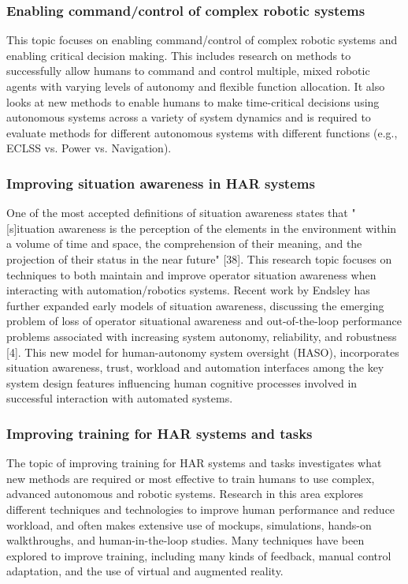 \subsubsection{Enabling command/control of complex robotic systems}
This topic focuses on enabling command/control of complex robotic systems and enabling critical decision making. This includes research on methods to successfully allow humans to command and control multiple, mixed robotic agents with varying levels of autonomy and flexible function allocation. It also looks at new methods to enable humans to make time-critical decisions using autonomous systems across a variety of system dynamics and is required to evaluate methods for different autonomous systems with different functions (e.g., ECLSS vs. Power vs. Navigation).

\subsubsection{Improving situation awareness in HAR systems}
One of the most accepted definitions of situation awareness states that "[s]ituation awareness is the perception of the elements in the environment within a volume of time and space, the comprehension of their meaning, and the projection of their status in the near future" [38]. This research topic focuses on techniques to both maintain and improve operator situation awareness when interacting with automation/robotics systems. Recent work by Endsley has further expanded early models of situation awareness, discussing the emerging problem of loss of operator situational awareness and out-of-the-loop performance problems associated with increasing system autonomy, reliability, and robustness [4]. This new model for human-autonomy system oversight (HASO), incorporates situation awareness, trust, workload and automation interfaces among the key system design features influencing human cognitive processes involved in successful interaction with automated systems.

\subsubsection{Improving training for HAR systems and tasks}
The topic of improving training for HAR systems and tasks investigates what new methods are required or most effective to train humans to use complex, advanced autonomous and robotic systems. Research in this area explores different techniques and technologies to improve human performance and reduce workload, and often makes extensive use of mockups, simulations, hands-on walkthroughs, and human-in-the-loop studies. Many techniques have been explored to improve training, including many kinds of feedback, manual control adaptation, and the use of virtual and augmented reality.

